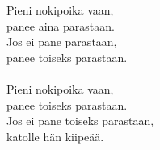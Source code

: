 
Pieni nokipoika vaan, \\ panee aina parastaan. \\ Jos ei pane parastaan, \\ panee toiseks parastaan. \\ \hspace{10mm} \\ Pieni nokipoika vaan, \\ panee toiseks parastaan. \\ Jos ei pane toiseks parastaan, \\ katolle hän kiipeää.